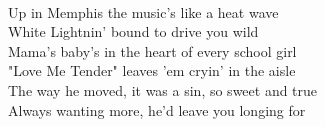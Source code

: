 \\
Up in Memphis the music's like a heat wave \\
White Lightnin' bound to drive you wild \\
Mama's baby's in the heart of every school girl \\
"Love Me Tender" leaves 'em cryin' in the aisle \\
The way he moved, it was a sin, so sweet and true \\
Always wanting more, he'd leave you longing for \\
